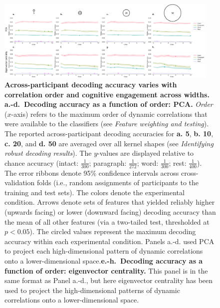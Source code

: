 \documentclass{article}
\begin{document}
\begin{figure}[p!]
\centering
\includegraphics[width=0.95\textwidth]{figs/decode_levels_widths}
\caption{\textbf{Across-participant decoding accuracy varies with
      correlation order and cognitive engagement across widths.}
    \textbf{a.-d.~Decoding accuracy as a function of order: PCA.} \textit{Order} ($x$-axis) refers to the maximum order of dynamic
    correlations that were available to the classifiers (see
    \textit{Feature weighting and testing}).  The reported
    across-participant decoding accuracies for \textbf{a. 5},
    \textbf{b. 10}, \textbf{c. 20}, and \textbf{d. 50}  are averaged over all
    kernel shapes (see \textit{Identifying robust decoding
      results}).  The $y$-values are displayed relative to chance
    accuracy (intact: $\frac{1}{300}$; paragraph: $\frac{1}{272}$;
    word: $\frac{1}{300}$; rest: $\frac{1}{400}$).  The error ribbons
    denote 95\% confidence intervals across cross-validation folds
    (i.e., random assignments of participants to the training and test
    sets).  The colors denote the experimental condition.  Arrows
    denote sets of features that yielded reliably higher (upwards
    facing) or lower (downward facing) decoding accuracy than the mean
    of all other features (via a two-tailed test, thresholded at
    $p < 0.05$).  The circled values represent
    the maximum decoding accuracy within each experimental condition.  Panels a.-d. used PCA to
    project each high-dimensional pattern of dynamic correlations onto
    a lower-dimensional space.\textbf{e.-h.~Decoding accuracy as a
      function of order: eigenvector centrality.} This panel is in the
    same format as Panel a.-d., but here eigenvector centrality has been
    used to project the high-dimensional patterns of dynamic
    correlations onto a lower-dimensional space.}
\label{fig:supp_widths}
\end{figure}
\end{document}
